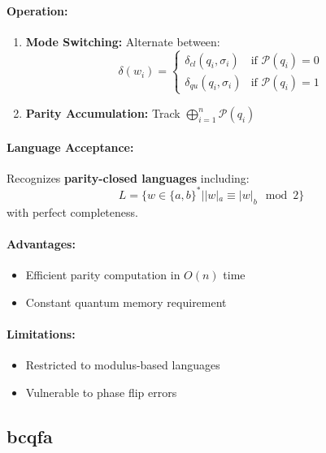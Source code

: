 \paragraph{Operation:}
\begin{enumerate}
    \item \textbf{Mode Switching:} Alternate between:
    \[
    \delta(w_i) = \begin{cases}
        \delta_{cl}(q_i, \sigma_i) & \text{if } \mathcal{P}(q_i) = 0 \\
        \delta_{qu}(q_i, \sigma_i) & \text{if } \mathcal{P}(q_i) = 1
    \end{cases}
    \]
    \item \textbf{Parity Accumulation:} Track $\bigoplus_{i=1}^n \mathcal{P}(q_i)$
\end{enumerate}

\paragraph{Language Acceptance:}
Recognizes \textbf{parity-closed languages} including:
\[
L = \{w \in \{a,b\}^* | |w|_a \equiv |w|_b \mod 2\} 
\]
\cite{hirvensalo2012quantum}
with perfect completeness.

\paragraph{Advantages:}
\begin{itemize}
    \item Efficient parity computation in $O(n)$ time
    \item Constant quantum memory requirement \cite{yakaryilmaz2011}
\end{itemize}

\paragraph{Limitations:}
\begin{itemize}
    \item Restricted to modulus-based languages
    \item Vulnerable to phase flip errors
\end{itemize}

\subsection{\acrfull{bcqfa}}
\label{subsec:bcqfa}

